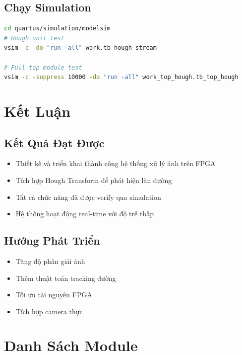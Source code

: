\documentclass[12pt,a4paper]{report}
\begin{document}
\section{Chạy Simulation}
\begin{lstlisting}[language=bash]
cd quartus/simulation/modelsim
# Hough unit test
vsim -c -do "run -all" work.tb_hough_stream

# Full top module test  
vsim -c -suppress 10000 -do "run -all" work_top_hough.tb_top_hough
\end{lstlisting}

\chapter{Kết Luận}

\section{Kết Quả Đạt Được}
\begin{itemize}
    \item Thiết kế và triển khai thành công hệ thống xử lý ảnh trên FPGA
    \item Tích hợp Hough Transform để phát hiện làn đường
    \item Tất cả chức năng đã được verify qua simulation
    \item Hệ thống hoạt động real-time với độ trễ thấp
\end{itemize}

\section{Hướng Phát Triển}
\begin{itemize}
    \item Tăng độ phân giải ảnh
    \item Thêm thuật toán tracking đường
    \item Tối ưu tài nguyên FPGA
    \item Tích hợp camera thực
\end{itemize}

\appendix
\chapter{Danh Sách Module}
\end{document}
